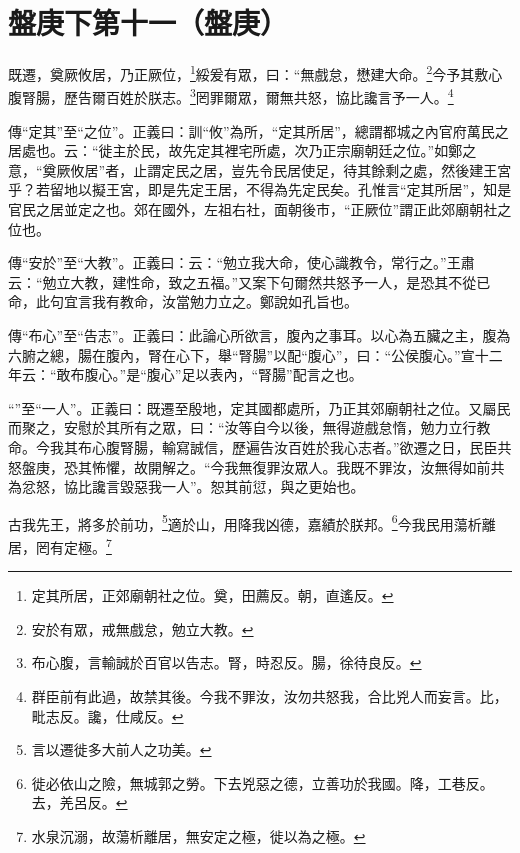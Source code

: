 \section{盤庚下第十一（盤庚）}

既遷，奠厥攸居，乃正厥位，\footnote{定其所居，正郊廟朝社之位。奠，田薦反。朝，直遙反。}綏爰有眾，曰：“無戲怠，懋建大命。\footnote{安於有眾，戒無戲怠，勉立大教。}今予其敷心腹腎腸，歷告爾百姓於朕志。\footnote{布心腹，言輸誠於百官以告志。腎，時忍反。腸，徐待良反。}罔罪爾眾，爾無共怒，協比讒言予一人。\footnote{群臣前有此過，故禁其後。今我不罪汝，汝勿共怒我，合比兇人而妄言。比，毗志反。讒，仕咸反。}

{\noindent\zhuan{}\fzbyks 傳“定其”至“之位”。正義曰：訓“攸”為所，“定其所居”，總謂都城之內官府萬民之居處也。云：“徙主於民，故先定其裡宅所處，次乃正宗廟朝廷之位。”如鄭之意，“奠厥攸居”者，止謂定民之居，豈先令民居使足，待其餘剩之處，然後建王宮乎？若留地以擬王宮，即是先定王居，不得為先定民矣。孔惟言“定其所居”，知是官民之居並定之也。郊在國外，左祖右社，面朝後市，“正厥位”謂正此郊廟朝社之位也。 \par}

{\noindent\zhuan{}\fzbyks 傳“安於”至“大教”。正義曰：云：“勉立我大命，使心識教令，常行之。”王肅云：“勉立大教，建性命，致之五福。”又案下句爾然共怒予一人，是恐其不從已命，此句宜言我有教命，汝當勉力立之。鄭說如孔旨也。 \par}

{\noindent\zhuan{}\fzbyks 傳“布心”至“告志”。正義曰：此論心所欲言，腹內之事耳。以心為五臟之主，腹為六腑之總，腸在腹內，腎在心下，舉“腎腸”以配“腹心”，曰：“公侯腹心。”宣十二年云：“敢布腹心。”是“腹心”足以表內，“腎腸”配言之也。 \par}

{\noindent\shu{}\fzkt “”至“一人”。正義曰：既遷至殷地，定其國都處所，乃正其郊廟朝社之位。又屬民而聚之，安慰於其所有之眾，曰：“汝等自今以後，無得遊戲怠惰，勉力立行教命。今我其布心腹腎腸，輸寫誠信，歷遍告汝百姓於我心志者。”欲遷之日，民臣共怒盤庚，恐其怖懼，故開解之。“今我無復罪汝眾人。我既不罪汝，汝無得如前共為忿怒，協比讒言毀惡我一人”。恕其前愆，與之更始也。 \par}

古我先王，將多於前功，\footnote{言以遷徙多大前人之功美。}適於山，用降我凶德，嘉績於朕邦。\footnote{徙必依山之險，無城郭之勞。下去兇惡之德，立善功於我國。降，工巷反。去，羌呂反。}今我民用蕩析離居，罔有定極。\footnote{水泉沉溺，故蕩析離居，無安定之極，徙以為之極。}

